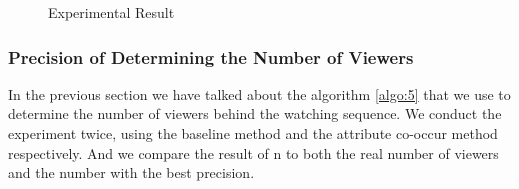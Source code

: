 \begin{figure}
\caption{Experimental Result}
\label{fig:exresult}
\end{figure}

\subsubsection{Precision of Determining the Number of Viewers}
In the previous section we have talked about the algorithm \ref{algo:5} that we use to determine the number of viewers behind the watching sequence.
We conduct the experiment twice, using the baseline method and the attribute co-occur method respectively. And we compare the result of n to both 
the real number of viewers and the number with the best precision. 

